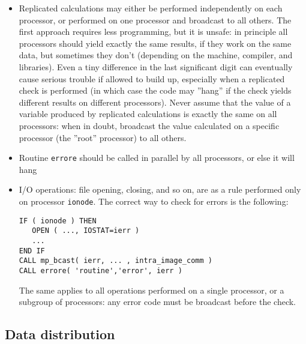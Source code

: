 \documentclass[12pt,a4paper]{article}
\begin{document}
\begin{itemize}
\item
Replicated calculations may either be performed independently on
each processor, or performed on one processor and broadcast to all
others. The first approach requires less programming, but it is unsafe:
in principle all processors should yield exactly the same results, if
they work on the same data, but sometimes they don't (depending on the
machine, compiler, and libraries). Even a tiny difference in the last
significant digit can eventually cause serious trouble if allowed to
 build up, especially when a replicated check is performed (in which
case the code may ''hang'' if the check yields different results on
different processors). Never assume that the value of a variable produced
by replicated calculations is exactly the same on all processors: when in
doubt, broadcast the value calculated on a specific processor (the ''root''
processor) to all others.
\item
Routine \texttt{errore} should be called in parallel by all processors,
or else it will hang
\item
I/O operations: file opening, closing, and so on, are as a rule performed
only on processor \texttt{ionode}. The correct way to check for errors is
the following:
\begin{verbatim}
IF ( ionode ) THEN
   OPEN ( ..., IOSTAT=ierr )
   ...
END IF
CALL mp_bcast( ierr, ... , intra_image_comm )
CALL errore( 'routine','error', ierr )
\end{verbatim}
The same applies to all operations performed on a single processor,
or a subgroup of processors: any error code must be broadcast before
the check.
\end{itemize}

\subsection{Data distribution}
\end{document}
